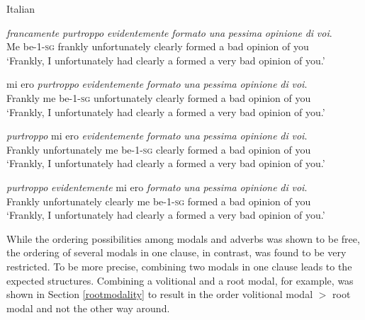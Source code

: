 \begin{exe} 
\ex Italian \citep[49]{cinque1999adverbs}\label{finiteauxcinqueq} \begin{xlist} 
\ex {} {\textit{francamente}} {\textit{purtroppo}} {\textit{evidentemente}} {\textit{formato}} {\textit{una}} {\textit{pessima}} {\textit{opinione}} {\textit{di}} {\textit{voi}.}  \\
{Me be-1-\textsc{sg}} {frankly} {unfortunately} {clearly} {formed} {a} {bad} {opinion} {of} {you} \\
\trans `Frankly, I unfortunately had clearly a formed a very bad opinion of you.' \label{finiteauxcinqueaq}

\ex {} {mi ero} {\textit{purtroppo}} {\textit{evidentemente}} {\textit{formato}} {\textit{una}} {\textit{pessima}} {\textit{opinione}} {\textit{di}} {\textit{voi}.}  \\
 {Frankly} {me be-1-\textsc{sg}} {unfortunately} {clearly} {formed} {a} {bad} {opinion} {of} {you} \\
\trans `Frankly, I unfortunately had clearly a formed a very bad opinion of you.' \label{finiteauxcinquebq}

\ex {}  {\textit{purtroppo}} {mi ero} {\textit{evidentemente}} {\textit{formato}} {\textit{una}} {\textit{pessima}} {\textit{opinione}} {\textit{di}} {\textit{voi}.}  \\
 {Frankly}  {unfortunately} {me be-1-\textsc{sg}} {clearly} {formed} {a} {bad} {opinion} {of} {you} \\
\trans `Frankly, I unfortunately had clearly a formed a very bad opinion of you.' \label{finiteauxcinquecq}

\ex {}  {\textit{purtroppo}}  {\textit{evidentemente}} {mi ero} {\textit{formato}} {\textit{una}} {\textit{pessima}} {\textit{opinione}} {\textit{di}} {\textit{voi}.}  \\
 {Frankly}  {unfortunately}  {clearly} {me be-1-\textsc{sg}} {formed} {a} {bad} {opinion} {of} {you} \\
\trans `Frankly, I unfortunately had clearly a formed a very bad opinion of you.' \label{finiteauxcinquecq}

\end{xlist} 
\end{exe}

\noindent While the ordering possibilities among modals and adverbs was shown to be free, the ordering of several modals in one clause, in contrast, was found to be very restricted. To be more precise, combining two modals in one clause leads to the expected structures. Combining a volitional and a root modal, for example, was shown in Section \ref{rootmodality} to result in the order volitional modal $>$ root modal and not the other way around.

